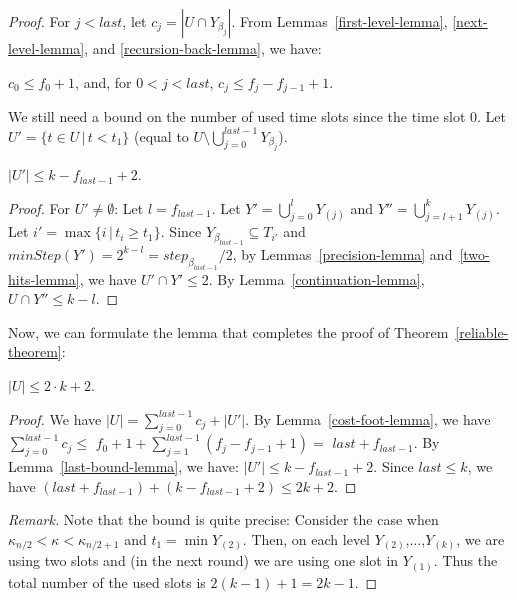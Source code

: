 \documentclass{llncs}
\begin{document}
\begin{proof}
For $j<last$, let $c_j= | U\cap Y_{\beta_j}|$.
From Lemmas~\ref{first-level-lemma}, 
\ref{next-level-lemma}, and \ref{recursion-back-lemma},
we have:
\begin{lemma}\label{cost-foot-lemma}
$c_0\le f_0+1$, and,
for $0< j<last$, $c_j\le f_j-f_{j-1}+1$.
\end{lemma}

We still need a bound on the number of used time slots since the time slot 0.
Let $U'=\{t\in U\,|\,t<t_1\}$ (equal to $U\setminus \bigcup_{j=0}^{last-1} Y_{\beta_j}$).
%
\begin{lemma}\label{last-bound-lemma}
$|U'|\le k-f_{last-1}+2$.
\end{lemma}
\begin{proof}
For $U'\not=\emptyset$:
Let $l=f_{last-1}$.
Let $Y'=\bigcup_{j=0}^{l} Y_{(j)}$ and $Y''=\bigcup_{j=l+1}^k Y_{(j)}$.
Let $i'=\max\{i\,|\, t_i\ge t_1\}$.
Since $Y_{\beta_{last-1}}\subseteq T_{i'}$ 
and $minStep(Y')=2^{k-l}=step_{\beta_{last-1}}/2$, 
by Lemmas~\ref{precision-lemma} and~\ref{two-hits-lemma},
we have $U'\cap Y'\le 2$.
By Lemma~\ref{continuation-lemma}, 
$U\cap Y''\le k-l$.
\end{proof}

Now, we can formulate the lemma that completes the proof of Theorem~\ref{reliable-theorem}:
\begin{lemma}\label{energy-lemma}
$|U|\le 2\cdot k+2$.
\end{lemma}

\begin{proof}
We have $|U|= \sum_{j=0}^{last-1} c_j + |U'|$.
By Lemma~\ref{cost-foot-lemma}, we have
$\sum_{j=0}^{last-1} c_j\le$ 
$f_0+1+\sum_{j=1}^{last-1}(f_j-f_{j-1}+1)=$
$last+f_{last-1}$.
By Lemma~\ref{last-bound-lemma}, we have:
$|U'|\le k-f_{last-1}+2$.
Since $last\le k$, we have
$(last+f_{last-1})+(k-f_{last-1}+2)\le 2k+2$.
\end{proof}

{\em Remark.}
Note that the bound is quite precise:
Consider the case when $\kappa_{n/2}<\kappa<\kappa_{n/2+1}$
and $t_1=\min Y_{(2)}$.
Then, on each level $Y_{(2)}$,$\ldots$,$Y_{(k)}$,
we are using two slots and (in the next round) 
we are using one slot in $Y_{(1)}$.
Thus the total number of the used slots is $2(k-1)+1=2k-1$. 
\end{proof} %
\end{document}
